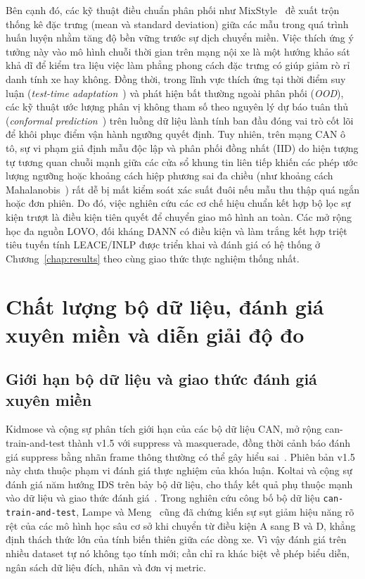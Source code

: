 \documentclass[12pt, a4paper, reqno, oneside]{book}
\begin{document}
Bên cạnh đó, các kỹ thuật điều chuẩn phân phối như MixStyle~\cite{zhou2021mixstyle} đề xuất trộn thống kê đặc trưng (mean và standard deviation) giữa các mẫu trong quá trình huấn luyện nhằm tăng độ bền vững trước sự dịch chuyển miền. Việc thích ứng ý tưởng này vào mô hình chuỗi thời gian trên mạng nội xe là một hướng khảo sát khả dĩ để kiểm tra liệu việc làm phẳng phong cách đặc trưng có giúp giảm rò rỉ danh tính xe hay không. Đồng thời, trong lĩnh vực thích ứng tại thời điểm suy luận (\textit{test-time adaptation}~\cite{wang2020tent}) và phát hiện bất thường ngoài phân phối (\textit{OOD}), các kỹ thuật ước lượng phân vị không tham số theo nguyên lý dự báo tuân thủ (\textit{conformal prediction}~\cite{tibshirani2019conformal}) trên luồng dữ liệu lành tính ban đầu đóng vai trò cốt lõi để khôi phục điểm vận hành ngưỡng quyết định. Tuy nhiên, trên mạng CAN ô tô, sự vi phạm giả định mẫu độc lập và phân phối đồng nhất (IID) do hiện tượng tự tương quan chuỗi mạnh giữa các cửa sổ khung tin liên tiếp khiến các phép ước lượng ngưỡng hoặc khoảng cách hiệp phương sai đa chiều (như khoảng cách Mahalanobis~\cite{lee2018mahalanobis}) rất dễ bị mất kiểm soát xác suất đuôi nếu mẫu thu thập quá ngắn hoặc đơn phiên. Do đó, việc nghiên cứu các cơ chế hiệu chuẩn kết hợp bộ lọc sự kiện trượt là điều kiện tiên quyết để chuyển giao mô hình an toàn. Các mở rộng học đa nguồn LOVO, đối kháng DANN có điều kiện và làm trắng kết hợp triệt tiêu tuyến tính LEACE/INLP được triển khai và đánh giá có hệ thống ở Chương~\ref{chap:results} theo cùng giao thức thực nghiệm thống nhất.

\section{Chất lượng bộ dữ liệu, đánh giá xuyên miền và diễn giải độ đo}
\subsection{Giới hạn bộ dữ liệu và giao thức đánh giá xuyên miền}
Kidmose và cộng sự phân tích giới hạn của các bộ dữ liệu CAN, mở rộng can-train-and-test thành v1.5 với suppress và masquerade, đồng thời cảnh báo đánh giá suppress bằng nhãn frame thông thường có thể gây hiểu sai~\cite{kidmose2025cansleuth}. Phiên bản v1.5 này chưa thuộc phạm vi đánh giá thực nghiệm của khóa luận. Koltai và cộng sự đánh giá năm hướng IDS trên bảy bộ dữ liệu, cho thấy kết quả phụ thuộc mạnh vào dữ liệu và giao thức đánh giá~\cite{koltai2026trust}. Trong nghiên cứu công bố bộ dữ liệu \texttt{can-train-and-test}, Lampe và Meng~\cite{lampe2024curated} cũng đã chứng kiến sự sụt giảm hiệu năng rõ rệt của các mô hình học sâu cơ sở khi chuyển từ điều kiện A sang B và D, khẳng định thách thức lớn của tính biến thiên giữa các dòng xe. Vì vậy đánh giá trên nhiều dataset tự nó không tạo tính mới; cần chỉ ra khác biệt về phép biểu diễn, ngân sách dữ liệu đích, nhãn và đơn vị metric.
\end{document}
